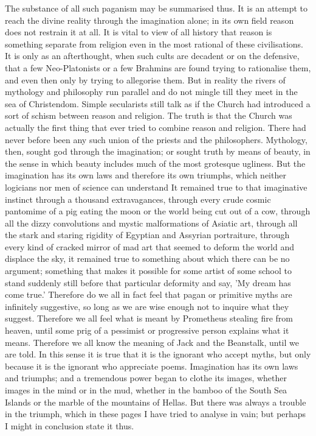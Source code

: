The substance of all such paganism may be summarised thus. It is an attempt to reach the divine reality through the imagination alone; in its own field reason does not restrain it at all. It is vital to view of all history that reason is something separate from religion even in the most rational of these civilisations. It is only as an afterthought, when such cults are decadent or on the defensive, that a few Neo-Platonists or a few Brahmins are found trying to rationalise them, and even then only by trying to allegorise them. But in reality the rivers of mythology and philosophy run parallel and do not mingle till they meet in the sea of Christendom. Simple secularists still talk as if the Church had introduced a sort of schism between reason and religion. The truth is that the Church was actually the first thing that ever tried to combine reason and religion. There had never before been any such union of the priests and the philosophers. Mythology, then, sought god through the imagination; or sought truth by means of beauty, in the sense in which beauty includes much of the most grotesque ugliness. But the imagination has its own laws and therefore its own triumphs, which neither logicians nor men of science can understand It remained true to that imaginative instinct through a thousand extravagances, through every crude cosmic pantomime of a pig eating the moon or the world being cut out of a cow, through all the dizzy convolutions and mystic malformations of Asiatic art, through all the stark and staring rigidity of Egyptian and Assyrian portraiture, through every kind of cracked mirror of mad art that seemed to deform the world and displace the sky, it remained true to something about which there can be no argument; something that makes it possible for some artist of some school to stand suddenly still before that particular deformity and say, 'My dream has come true.' Therefore do we all in fact feel that pagan or primitive myths are infinitely suggestive, so long as we are wise enough not to inquire what they suggest. Therefore we all feel what is meant by Prometheus stealing fire from heaven, until some prig of a pessimist or progressive person explains what it means. Therefore we all know the meaning of Jack and the Beanstalk, until we are told. In this sense it is true that it is the ignorant who accept myths, but only because it is the ignorant who appreciate poems. Imagination has its own laws and triumphs; and a tremendous power began to clothe its images, whether images in the mind or in the mud, whether in the bamboo of the South Sea Islands or the marble of the mountains of Hellas. But there was always a trouble in the triumph, which in these pages I have tried to analyse in vain; but perhaps I might in conclusion state it thus.

